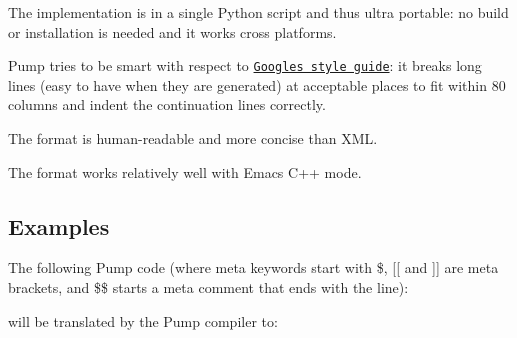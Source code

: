 \begin{DoxyItemize}
\item The implementation is in a single Python script and thus ultra portable\+: no build or installation is needed and it works cross platforms.
\item Pump tries to be smart with respect to \href{https://github.com/google/styleguide}{\tt Google\textquotesingle{}s style guide}\+: it breaks long lines (easy to have when they are generated) at acceptable places to fit within 80 columns and indent the continuation lines correctly.
\item The format is human-\/readable and more concise than X\+ML.
\item The format works relatively well with Emacs\textquotesingle{} C++ mode.
\end{DoxyItemize}

\subsection*{Examples}

The following Pump code (where meta keywords start with {\ttfamily \$}, {\ttfamily \mbox{[}\mbox{[}} and {\ttfamily \mbox{]}\mbox{]}} are meta brackets, and {\ttfamily \$\$} starts a meta comment that ends with the line)\+:


\begin{DoxyCode}{0}
\DoxyCodeLine{\$for i [[}
\DoxyCodeLine{\$if i == 0 [[}
\DoxyCodeLine{]] \$elif i <= 2 [[}
\DoxyCodeLine{]] \$else [[}
\DoxyCodeLine{]]}
\DoxyCodeLine{\};}
\DoxyCodeLine{}
\DoxyCodeLine{]]}
\end{DoxyCode}


will be translated by the Pump compiler to\+:


\begin{DoxyCode}{0}
\DoxyCodeLine{\};}
\DoxyCodeLine{}
\DoxyCodeLine{\};}
\DoxyCodeLine{}
\DoxyCodeLine{\};}
\DoxyCodeLine{}
\DoxyCodeLine{\};}
\end{DoxyCode}


